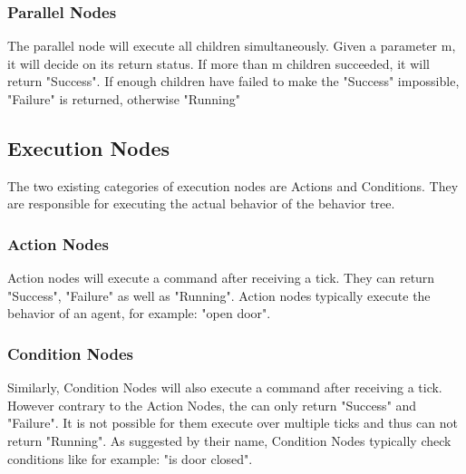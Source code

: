 \subsubsection{Parallel Nodes}
The parallel node will execute all children simultaneously. Given a parameter m, it will decide on its return status. If more than m children succeeded, it will return "Success". If enough children have failed to make the "Success" impossible, "Failure" is returned, otherwise "Running"

\subsection{Execution Nodes}
The two existing categories of execution nodes are Actions and Conditions. They are responsible for executing the actual behavior of the behavior tree.

\subsubsection{Action Nodes}
Action nodes will execute a command after receiving a tick. They can return "Success", "Failure" as well as "Running". Action nodes typically execute the behavior of an agent, for example: "open door".

\subsubsection{Condition Nodes}
Similarly, Condition Nodes will also execute a command after receiving a tick. However contrary to the  Action Nodes, the can only return "Success" and "Failure". It is not possible for them execute over multiple ticks and thus can not return "Running". As suggested by their name, Condition Nodes typically check conditions like for example: "is door closed".